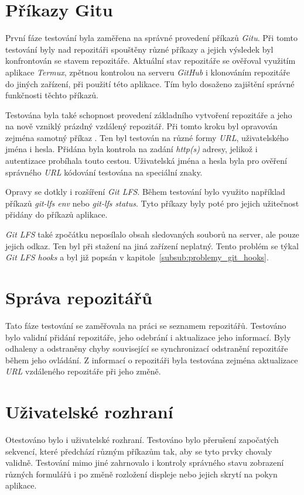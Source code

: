 \section{Příkazy Gitu}
První fáze testování byla zaměřena na správné provedení příkazů \emph{Gitu}. Při tomto testování byly nad repozitáři spouštěny různé příkazy a jejich výsledek byl konfrontován se stavem repozitáře. Aktuální stav repozitáře se ověřoval využitím aplikace \emph{Termux}, zpětnou kontrolou na serveru \emph{GitHub} i klonováním repozitáře do jiných zařízení, při použití této aplikace. Tím bylo dosaženo zajištění správné funkčnosti těchto příkazů.

Testována byla také schopnost provedení základního vytvoření repozitáře a jeho  na nově vzniklý prázdný vzdálený repozitář. Při tomto kroku byl opravován zejména samotný příkaz . Ten byl testován na různé formy \emph{URL}, uživatelského jména i hesla. Přidána byla kontrola na zadání \emph{http(s)} adresy, jelikož i autentizace probíhala touto cestou. Uživatelská jména a hesla byla pro ověření správného \emph{URL} kódování testována na speciální znaky.

Opravy se dotkly i rozšíření \emph{Git LFS}. Během testování bylo využito například příkazů \emph{git-lfs env} nebo \emph{git-lfs status}. Tyto příkazy byly poté pro jejich užitečnost přidány do příkazů aplikace.

\emph{Git LFS} také zpočátku neposílalo obsah sledovaných souborů na server, ale pouze jejich odkaz. Ten byl při stažení na jiná zařízení neplatný. Tento problém se týkal \emph{Git LFS hooks} a byl již popsán v kapitole~\ref{subsub:problemy_git_hooks}.

\section{Správa repozitářů}
Tato fáze testování se zaměřovala na práci se seznamem repozitářů. Testováno bylo validní přidání repozitáře, jeho odebrání i aktualizace jeho informací. Byly odhaleny a odstraněny chyby související se synchronizací odstranění repozitáře během jeho ovládání. Z informací o repozitáři byla testována zejména aktualizace \emph{URL} vzdáleného repozitáře při jeho změně.

\newpage
\section{Uživatelské rozhraní}
Otestováno bylo i uživatelské rozhraní. Testováno bylo přerušení započatých sekvencí, které předchází různým příkazům tak, aby se tyto prvky chovaly validně. Testování mimo jiné zahrnovalo i kontroly správného stavu zobrazení různých formulářů i po změně rozložení displeje nebo jejich skrytí na pokyn aplikace.

